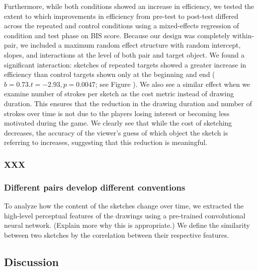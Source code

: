 \documentclass[10pt,letterpaper]{article}
\begin{document}
Furthermore, while both conditions showed an increase in efficiency, we tested the extent to which improvements in efficiency from pre-test to post-test differed across the repeated and control conditions using a mixed-effects regression of condition and test phase on BIS score. Because our design was completely within-pair, we included a maximum random effect structure with random intercept, slopes, and interactions at the level of both pair and target object. We found a significant interaction: sketches of repeated targets showed a greater increase in efficiency than control targets shown only at the beginning and end ($b = 0.73. t = -2.93, p = 0.0047$; see Figure ). We also see a similar effect when we examine number of strokes per sketch as the cost metric instead of drawing duration. This ensures that the reduction in the drawing duration and number of strokes over time is not due to the players losing interest or becoming less motivated during the game. We clearly see that while the cost of sketching decreases, the accuracy of the viewer's guess of which object the sketch is referring to increases, suggesting that this reduction is meaningful.





\subsubsection{XXX}

\subsubsection{Different pairs develop different conventions} To analyze how the content of the sketches change over time, we extracted the high-level perceptual features of the drawings using a pre-trained convolutional neural network. (Explain more why this is appropriate.) We define the similarity between two sketches by the correlation between their respective features.%


\subsection{Discussion}
\end{document}

